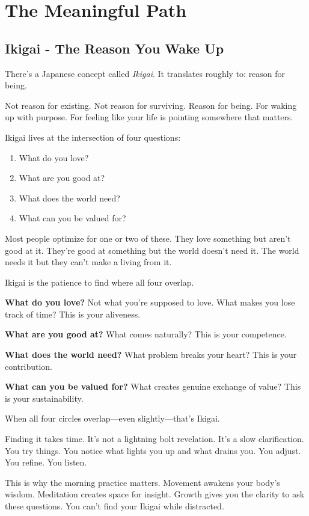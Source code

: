 \documentclass[11pt, a5paper, openright]{book}
\begin{document}
\part{The Meaningful Path}

\chapter{Ikigai - The Reason You Wake Up}

There's a Japanese concept called \textit{Ikigai}. It translates roughly to: reason for being.

Not reason for existing. Not reason for surviving. Reason for being. For waking up with purpose. For feeling like your life is pointing somewhere that matters.

Ikigai lives at the intersection of four questions:

\begin{enumerate}
\item What do you love?
\item What are you good at?
\item What does the world need?
\item What can you be valued for?
\end{enumerate}

Most people optimize for one or two of these. They love something but aren't good at it. They're good at something but the world doesn't need it. The world needs it but they can't make a living from it.

Ikigai is the patience to find where all four overlap.

\textbf{What do you love?} Not what you're supposed to love. What makes you lose track of time? This is your aliveness.

\textbf{What are you good at?} What comes naturally? This is your competence.

\textbf{What does the world need?} What problem breaks your heart? This is your contribution.

\textbf{What can you be valued for?} What creates genuine exchange of value? This is your sustainability.

When all four circles overlap—even slightly—that's Ikigai.

Finding it takes time. It's not a lightning bolt revelation. It's a slow clarification. You try things. You notice what lights you up and what drains you. You adjust. You refine. You listen.

This is why the morning practice matters. Movement awakens your body's wisdom. Meditation creates space for insight. Growth gives you the clarity to ask these questions. You can't find your Ikigai while distracted.
\end{document}
